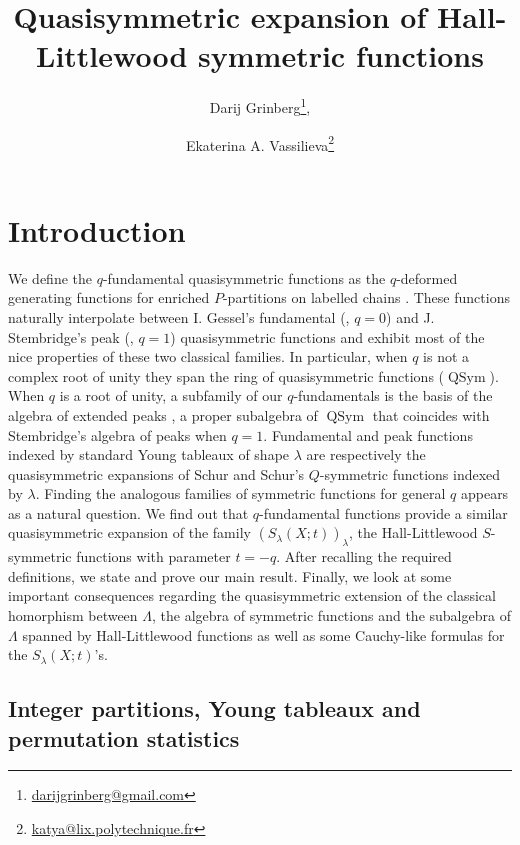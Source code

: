 \documentclass[revision]{FPSAC2024}
\title{Quasisymmetric expansion of Hall-Littlewood symmetric functions}
\author[D. Grinberg \and E.A. Vassilieva]{Darij Grinberg\thanks{\href{mailto:darijgrinberg@gmail.com}{darijgrinberg@gmail.com}}\addressmark{1}, \and Ekaterina A. Vassilieva\thanks{\href{mailto:katya@lix.polytechnique.fr}{katya@lix.polytechnique.fr}}\addressmark{2}}
\newcommand{\la}{\lambda}
\newcommand{\QSym}{\operatorname{QSym}}
\begin{document}
\maketitle


\section{Introduction}
We define the $q$-fundamental quasisymmetric functions as the $q$-deformed generating functions for enriched $P$-partitions on labelled chains \cite{GriVas22, GriVas23}. These functions naturally interpolate between I. Gessel's fundamental (\cite{Ges84}, $q=0$) and J. Stembridge's peak (\cite{Ste97}, $q=1$) quasisymmetric functions and exhibit most of the nice properties of these two classical families. In particular, when $q$ is not a complex root of unity they span the ring of quasisymmetric functions ($\QSym$). When $q$ is a root of unity, a subfamily of our $q$-fundamentals is the basis of the algebra of extended peaks \cite{GriVas23}, a proper subalgebra of $\QSym$ that coincides with Stembridge's algebra of peaks when $q=1$. Fundamental and peak functions indexed by standard Young tableaux of shape $\la$ are respectively the quasisymmetric expansions of Schur and Schur's $Q$-symmetric functions indexed by $\la$. Finding the analogous families of symmetric functions for general $q$ appears as a natural question. We find out that $q$-fundamental functions provide a similar quasisymmetric expansion of the family $\left (S_\la(X;t)\right)_\la$, the Hall-Littlewood $S$-symmetric functions with parameter $t=-q$. After recalling the required definitions, we state and prove our main result. Finally, we look at some important consequences regarding the quasisymmetric extension of the classical homorphism between $\Lambda$, the algebra of symmetric functions and the subalgebra of $\Lambda$ spanned by Hall-Littlewood functions as well as some Cauchy-like formulas for the $S_\la(X;t)$'s.
\subsection{Integer partitions, Young tableaux and permutation statistics}
\end{document}
